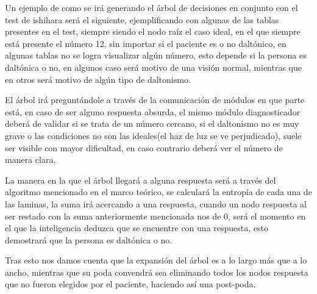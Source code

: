 \documentclass[10pt]{article}
\begin{document}
Un ejemplo de como se irá generando el árbol de decisiones en conjunto con el test de ishihara será el siguiente, ejemplificando con algunas de las tablas presentes en el test, siempre siendo el nodo raíz el caso ideal, en el que siempre está presente el número 12, sin importar si el paciente es o no daltónico, en algunas tablas no se logra visualizar algún número, esto depende si la persona es daltónica o no, en algunos caso será motivo de una visión normal, mientras que en otros será motivo de algún tipo de daltonismo.

El árbol irá preguntándole a través de la comunicación de módulos en que parte está, en caso de ser alguno respuesta absurda, el mismo módulo diagnosticador deberá de validar si se trata de un número cercano, si el daltonismo no es muy grave o las condiciones no son las ideales(el haz de luz se ve perjudicado), suele ser visible con mayor dificultad, en caso contrario deberá ver el número de manera clara.  

La manera en la que el árbol llegará a alguna respuesta será a través del algoritmo mencionado en el marco teórico, se calculará la entropía de cada una de las laminas, la suma irá acercando a una respuesta, cuando un nodo respuesta al ser restado con la suma anteriormente mencionada nos de 0, será el momento en el que la inteligencia deduzca que se encuentre con una respuesta, esto demostrará que la persona es daltónica o no.

Tras esto nos damos cuenta que la expansión del árbol es a lo largo más que a lo ancho, mientras que su poda convendrá sea eliminando todos los nodos respuesta que no fueron elegidos por el paciente, haciendo así una post-poda.
\end{document}
